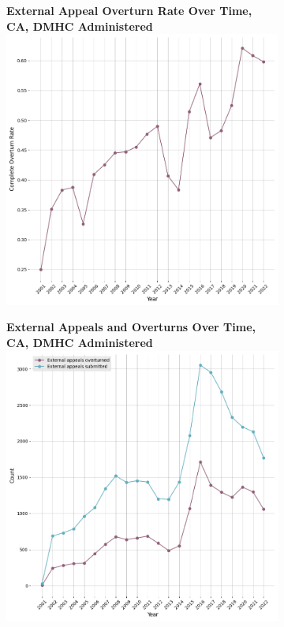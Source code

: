 \documentclass[12pt, a4paper,twoside]{report}
\theoremstyle{plain} %
\theoremstyle{definition} %
\theoremstyle{remark} %
\numberwithin{equation}{chapter}
\begin{document}
		
		\begin{figure}[h!]
			\centering
			\begin{subfigure}[b]{0.49\textwidth}
				\centering
				\textbf{External Appeal Overturn Rate Over Time, CA, DMHC Administered}
				\includegraphics[width=\textwidth]{images/ca_dmhc_external_appeals/external_appeal_overturn_rates_by_year.png}
			\end{subfigure}
			\hfill
			\begin{subfigure}[b]{0.49\textwidth}
				\centering
				\textbf{External Appeals and Overturns Over Time, CA, DMHC Administered}
				\includegraphics[width=\textwidth]{images/ca_dmhc_external_appeals/external_appeals_by_year.png}

\end{subfigure}
\end{figure}
\end{document}
